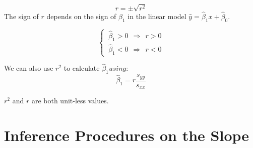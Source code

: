 \begin{skeleton}
	\begin{equation}	
	r = \pm \sqrt{ r^{2} }
	\end{equation}
The sign of $r$ depends on the sign of $\beta_{1}$ 
in the linear model $\hat{y} = \hat{\beta}_{1}x + \hat{\beta}_{0}$.%

\begin{equation}
\begin{cases}
~\hat{\beta}_{1} > 0	~~\Longrightarrow~~		r > 0	\\[1em]
~\hat{\beta}_{1} < 0	~~\Longrightarrow~~		r < 0
\end{cases}
\end{equation}

\end{skeleton}


\begin{nt}
We can also use $r^{2}$ to calculate $\hat{\beta}_{1} using:$
	\begin{equation}
	\hat{\beta}_{1} = r \frac{s_{yy}}{s_{xx}}
	\end{equation}
\end{nt}

\begin{nt}
	$r^{2}$ and $r$ are both unit-less values.
\end{nt}


%

\section{Inference Procedures on the Slope}
\label{sectionInferenceProcOnSlope}

